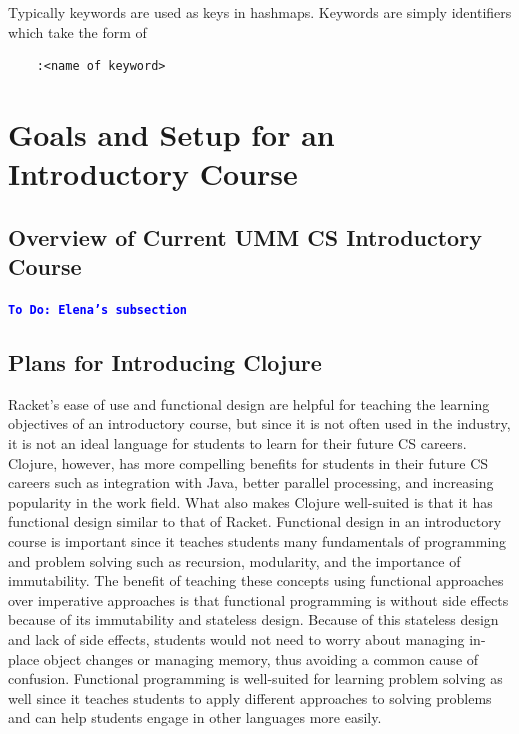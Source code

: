 \documentclass[12pt]{article}
\newcommand{\comment}[1]{{\bf \tt  {#1}}}
\newcommand{\emcomment}[1]{\textcolor{ForestGreen}{\comment{Elena: {#1}}}}
\newcommand{\todo}[1]{\textcolor{blue}{\comment{To Do: {#1}}}}
\newcommand{\pscomment}[1]{\textcolor{red}{\comment{Paul: {#1}}}}
\begin{document}
Typically keywords are used as keys in hashmaps. Keywords are simply identifiers which take the form of
\begin{verbatim}
	:<name of keyword>
\end{verbatim}

\section{Goals and Setup for an Introductory Course}\label{sec:racket-clojure}


\subsection{Overview of Current UMM CS Introductory Course}\label{subsec:course}
\todo{Elena's subsection}
~\cite{htdp}

\subsection{Plans for Introducing Clojure}\label{subsec:plans}
Racket's ease of use and functional design are helpful for teaching the learning objectives of an introductory course, but since it is not often used in the industry, it is not an ideal language for students to learn for their future CS careers. Clojure, however, has more compelling benefits for students in their future CS careers such as integration with Java, better parallel processing, and increasing popularity in the work field. What also makes Clojure well-suited is that it has functional design similar to that of Racket. Functional design in an introductory course is important since it teaches students many fundamentals of programming and problem solving such as recursion, modularity, and the importance of immutability. The benefit of teaching these concepts using functional approaches over imperative approaches is that functional programming is without side effects because of its immutability and stateless design. Because of this stateless design and lack of side effects, students would not need to worry about managing in-place object changes or managing memory, thus avoiding a common cause of confusion. Functional programming is well-suited for learning problem solving as well since it teaches students to apply different approaches to solving problems and can help students engage in other languages more easily.
\end{document}
